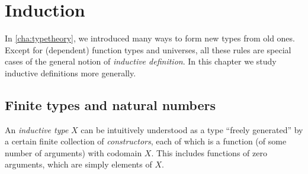 \let\zero\emptyt
\let\one\unit
\let\two\bool
\newcommand{\twoh}{\ensuremath{\mathbf{2^h}}\xspace}
\newcommand{\three}{\ensuremath{\mathbf{3}}\xspace}
\newcommand{\natw}{\ensuremath{\mathbf{N^w}}\xspace}
\newcommand{\nath}{\ensuremath{\mathbf{N^h}}\xspace}
\let\true\btrue
\let\false\bfalse
\newcommand{\z}{\ensuremath{0}\xspace}
\newcommand{\zw}{\ensuremath{0^\mathbf{w}}\xspace}
\newcommand{\myInd}{\ensuremath{\mathbf{Ind \;}}\xspace}
\let\s\suc
\newcommand{\sw}{\ensuremath{\mathbf{s^w}}\xspace}
\newcommand{\alt}{\;|\;\;}
\newcommand{\disj}[2]{#1 + #2}
\newcommand{\der}{\vdash}
\newcommand{\dbl}{\ensuremath{\mathbf{double}}}
\newcommand{\nalg}{\mathsf{\nat Alg}}
\newcommand{\nhom}{\mathsf{\nat Hom}}
\newcommand{\ishinitw}{\ensuremath{\mathsf{isHinit_W}}}
\newcommand{\ishinitn}{\ensuremath{\mathsf{isHinit_\nat}}}
\newcommand{\w}{\mathsf{W}}
\newcommand{\walg}{\mathsf{\w Alg}}
\newcommand{\whom}{\mathsf{\w Hom}}

\chapter{Induction}
\label{cha:induction}

In \autoref{cha:typetheory}, we introduced many ways to form new types from old ones.
Except for (dependent) function types and universes, all these rules are special cases of the general notion of \emph{inductive definition}.
In this chapter we study inductive definitions more generally.


\section{Finite types and natural numbers}
\label{sec:bool-nat}

An \emph{inductive type} $X$ can be intuitively understood as a type ``freely generated'' by a certain finite collection of \emph{constructors}, each of which is a function (of some number of arguments) with codomain $X$.
This includes functions of zero arguments, which are simply elements of $X$.

